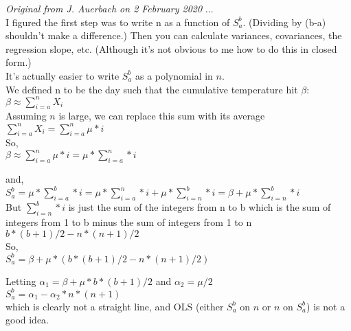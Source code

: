 \documentclass[11pt,letter]{article}
\begin{document}
\emph{Original from J. Auerbach on 2 February 2020} ...\\
I figured the first step was to write n as a function of $S_a^b$. (Dividing by (b-a) shouldn't make a difference.) Then you can calculate variances, covariances, the regression slope, etc. (Although it's not obvious to me how to do this in closed form.)\\

It's actually easier to write $S_a^b$ as a polynomial in $n$.\\

We defined n to be the day such that the cumulative temperature hit $\beta$:\\

$\beta \approx \sum_{i=a}^n X_i$\\

Assuming $n$ is large, we can replace this sum with its average\\

$\sum_{i=a}^n X_i = \sum_{i=a}^n \mu * i$\\

So,\\

$\beta \approx \sum_{i=a}^n \mu * i =  \mu * \sum_{i=a}^n * i$

and,\\

$S_a^b = \mu * \sum_{i=a}^b * i  = \mu * \sum_{i=a}^n * i  + \mu * \sum_{i=n}^b * i  = \beta + \mu * \sum_{i=n}^b * i $\\

But $\sum_{i=n}^b * i$ is just the sum of the integers from n to b which is the sum of integers from 1 to b minus the sum of integers from 1 to n\\

$b * (b + 1) / 2 - n * (n + 1) / 2 $\\

So,\\

$S_a^b  = \beta + \mu * (b * (b + 1) / 2 - n * (n + 1) / 2)$

Letting $\alpha_1 = \beta + \mu * b * (b + 1) / 2$ and $\alpha_2 = \mu/2$\\

$S_a^b = \alpha_1 -  \alpha_2 * n * (n + 1)$\\

which is clearly not a straight line, and OLS (either $S_a^b$  on $n$ or $n$ on $S_a^b$) is not a good idea.\\
\end{document}
